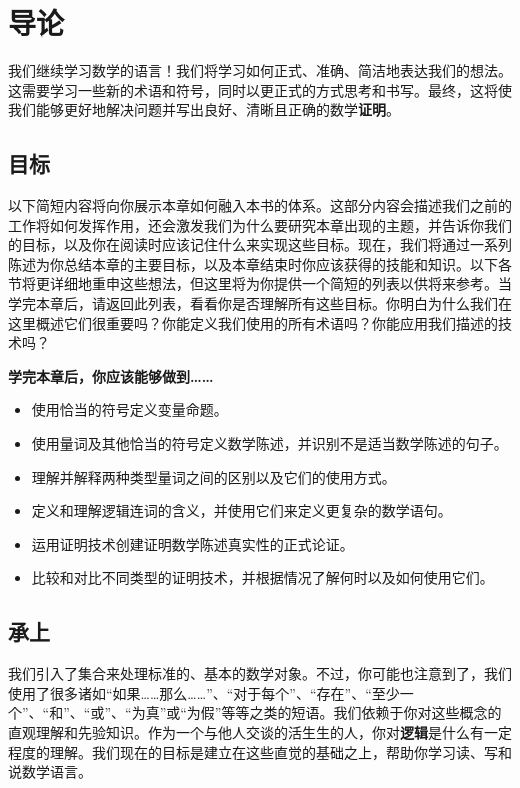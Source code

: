 \section{导论}

我们继续学习数学的语言！我们将学习如何正式、准确、简洁地表达我们的想法。这需要学习一些新的术语和符号，同时以更正式的方式思考和书写。最终，这将使我们能够更好地解决问题并写出良好、清晰且正确的数学\textbf{证明}。

\subsection{目标}

以下简短内容将向你展示本章如何融入本书的体系。这部分内容会描述我们之前的工作将如何发挥作用，还会激发我们为什么要研究本章出现的主题，并告诉你我们的目标，以及你在阅读时应该记住什么来实现这些目标。现在，我们将通过一系列陈述为你总结本章的主要目标，以及本章结束时你应该获得的技能和知识。以下各节将更详细地重申这些想法，但这里将为你提供一个简短的列表以供将来参考。当学完本章后，请返回此列表，看看你是否理解所有这些目标。你明白为什么我们在这里概述它们很重要吗？你能定义我们使用的所有术语吗？你能应用我们描述的技术吗？

\textbf{学完本章后，你应该能够做到……}

\begin{itemize}
    \item 使用恰当的符号定义变量命题。
    \item 使用量词及其他恰当的符号定义数学陈述，并识别不是适当数学陈述的句子。
    \item 理解并解释两种类型量词之间的区别以及它们的使用方式。
    \item 定义和理解逻辑连词的含义，并使用它们来定义更复杂的数学语句。
    \item 运用证明技术创建证明数学陈述真实性的正式论证。
    \item 比较和对比不同类型的证明技术，并根据情况了解何时以及如何使用它们。
\end{itemize}

\subsection{承上}

我们引入了集合来处理标准的、基本的数学对象。不过，你可能也注意到了，我们使用了很多诸如``如果……那么……''、``对于每个''、``存在''、``至少一个''、``和''、``或''、``为真''或``为假''等等之类的短语。我们依赖于你对这些概念的直观理解和先验知识。作为一个与他人交谈的活生生的人，你对\textbf{逻辑}是什么有一定程度的理解。我们现在的目标是建立在这些直觉的基础之上，帮助你学习读、写和说数学语言。

